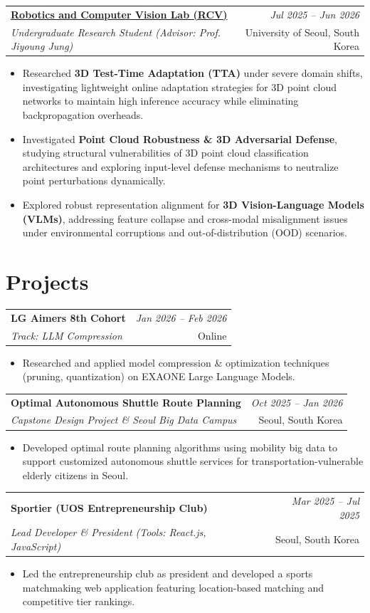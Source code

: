 \documentclass[a4paper,10pt]{article}
\makeatletter
\newcommand{\cvheading}[4]{
  \vspace{0.5mm}
  \begin{tabularx}{\textwidth}{@{}X r@{}}
    \textbf{#1} & \textit{\footnotesize #4} \\
    \textit{\small #2} & \footnotesize\color{subtext}#3 \\
  \end{tabularx}
  \vspace{-1.5mm}
}
\newcommand{\cvitemstart}{\begin{itemize}[leftmargin=3.5mm, itemsep=0.6mm, topsep=0.8mm]}
\newcommand{\cvitemend}{\end{itemize}\vspace{1.2mm}}
\makeatother
\begin{document}
\cvheading{\href{https://sites.google.com/view/rcvuos/home}{Robotics and Computer Vision Lab (RCV)}}{Undergraduate Research Student (Advisor: Prof. Jiyoung Jung)}{University of Seoul, South Korea}{Jul 2025 -- Jun 2026}
\cvitemstart
    \item Researched \textbf{3D Test-Time Adaptation (TTA)} under severe domain shifts, investigating lightweight online adaptation strategies for 3D point cloud networks to maintain high inference accuracy while eliminating backpropagation overheads.
    \item Investigated \textbf{Point Cloud Robustness \& 3D Adversarial Defense}, studying structural vulnerabilities of 3D point cloud classification architectures and exploring input-level defense mechanisms to neutralize point perturbations dynamically.
    \item Explored robust representation alignment for \textbf{3D Vision-Language Models (VLMs)}, addressing feature collapse and cross-modal misalignment issues under environmental corruptions and out-of-distribution (OOD) scenarios.
\cvitemend

\section{Projects}

\cvheading{LG Aimers 8th Cohort}{Track: LLM Compression}{Online}{Jan 2026 -- Feb 2026}
\cvitemstart
    \item Researched and applied model compression \& optimization techniques (pruning, quantization) on EXAONE Large Language Models.
\cvitemend

\cvheading{Optimal Autonomous Shuttle Route Planning}{Capstone Design Project \& Seoul Big Data Campus}{Seoul, South Korea}{Oct 2025 -- Jan 2026}
\cvitemstart
    \item Developed optimal route planning algorithms using mobility big data to support customized autonomous shuttle services for transportation-vulnerable elderly citizens in Seoul.
\cvitemend

\cvheading{Sportier (UOS Entrepreneurship Club)}{Lead Developer \& President (Tools: React.js, JavaScript)}{Seoul, South Korea}{Mar 2025 -- Jul 2025}
\cvitemstart
    \item Led the entrepreneurship club as president and developed a sports matchmaking web application featuring location-based matching and competitive tier rankings.
\cvitemend
\end{document}
